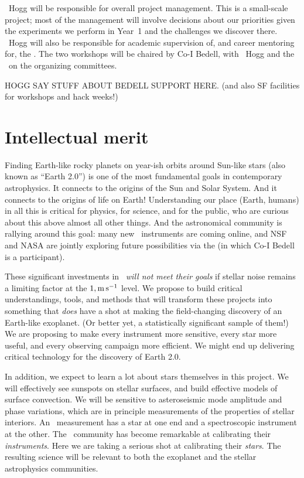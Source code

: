 \documentclass[12pt, letterpaper]{article}
\begin{document}
\PI\ Hogg will be responsible for overall project management. This is a
small-scale project; most of the management will involve decisions about our
priorities given the experiments we perform in Year~1 and the
challenges we discover there.
\PI\ Hogg will also be responsible for academic supervision of, and
career mentoring for, the \GRA.
The two workshops will be chaired by Co-I Bedell, with \PI\ Hogg and
the \GRA\ on the organizing committees.


HOGG SAY STUFF ABOUT BEDELL SUPPORT HERE. (and also SF facilities for workshops and hack weeks!)

\section{Intellectual merit}

Finding Earth-like rocky planets on year-ish orbits
around Sun-like stars (also known as ``Earth 2.0'') is one of the most fundamental goals
in contemporary astrophysics.
It connects to the origins of the Sun and Solar System.
And it connects to the origins of life on Earth!
Understanding our place (Earth, humans) in all this is critical for physics, for science, and for the
public, who are curious about this above almost all other things.
And the astronomical community is rallying around this goal: many new \EPRV\ instruments 
are coming online, and NSF and NASA are jointly exploring future possibilities via the 
 (in which Co-I Bedell is a participant).

These significant investments in \EPRV\ \textit{will not meet their goals} if
stellar noise remains a limiting factor at the $1,{\mathrm{m\,s^{-1}}}$ level. 
We propose to build critical understandings, tools, and methods that will transform
these projects into something that \textit{does} have a shot at making the field-changing 
discovery of an Earth-like exoplanet. (Or better yet, a statistically significant sample of them!) 
We are proposing to make every instrument more sensitive, every star more useful,
and every observing campaign more efficient.
We might end up delivering critical technology for the discovery of Earth 2.0.

In addition, we expect to learn a lot about stars themselves in this project.
We will effectively see sunspots on stellar surfaces, and build effective models
of surface convection.
We will be sensitive to asteroseismic mode amplitude and phase variations, which
are in principle measurements of the properties of stellar interiors.
An \EPRV\ measurement has a star at one end and a spectroscopic instrument at the other.
The \EPRV\ community has become remarkable at calibrating their \emph{instruments}.
Here we are taking a serious shot at calibrating their \emph{stars}. 
The resulting science will be relevant to both the exoplanet and the stellar astrophysics 
communities.
\end{document}
